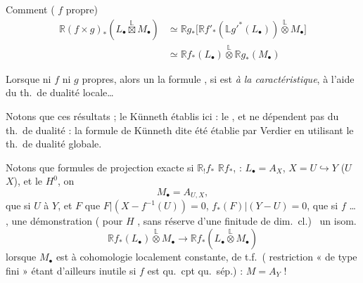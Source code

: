 \documentclass[11pt,a4paper]{article}
\begin{document}
Comment \ill{} \ill{} \ill{} (\ill{} \ill{} $f$ propre)
\begin{align*}
  \mathbb{R}(f \times g)_{*}(L_{\bullet} \overset{\mathbb{L}}{\boxtimes} M_{\bullet})
  &\simeq \mathbb{R}g_{*}\big[\mathbb{R}f'_{*}(\mathbb{L}g'^{*}(L_{\bullet})) \overset{\mathbb{L}}{\otimes} M_{\bullet}\big] \\
  &\simeq \mathbb{R}f_{*}(L_{\bullet}) \overset{\mathbb{L}}{\otimes} \mathbb{R}g_{*}(M_{\bullet})
\end{align*}

Lorsque ni $f$ ni $g$ propres, alors \struck{\ill{}} \ill{} \ill{} \ill{} un  \ill{} \ill{} \ill{} \ill{} \ill{}  la formule  \ill{}, si \ill{} est \emph{ à la caractéristique}, \ill{} \ill{} \ill{}  à l'aide du th.\ de dualité locale…

Notons que ces résultats ; le Künneth établis ici \ill{} \ill{} \ill{}  : le , et ne dépendent pas du th.\ de dualité : la formule de Künneth  dite   été établie par Verdier  en utilisant le th.\ de dualité globale.

Notons que  formules de projection  \ill{} \ill{} exacte si \ill{}  $\mathbb{R}_{!}f_{*}$ \ill{} $\mathbb{R}f_{*}$, \ill{} \ill{} \ill{} : $L_{\bullet} = A_{X}$, $X = U \hookrightarrow Y$ \ill{} \ill{} ($U$ \ill{} \ill{} $X$), et le $H^{0}$, on
\[
  M_{\bullet} = A_{U,X} ,
\]
\ill{} \ill{} \ill{} que si $U$ \ill{} \ill{} \ill{} \ill{} à $Y$, et $F$ \ill{} \ill{} que $F|(X - f^{-1}(U)) = 0$, \ill{} $f_{*}(F)|(Y - U) = 0$, \ill{} \ill{} que \ill{} \ill{} \ill{} si $f$ \ill{} \ill{}… \struck{\ill{}} , une démonstration   ( pour $H$  , sans \ill{} réserve d'une finitude de dim.\ cl.)\  \ill{} \ill{} \ill{} un isom.
\[
  \mathbb{R}f_{*}(L_{\bullet}) \overset{\mathbb{L}}{\otimes} M_{\bullet}
  \longrightarrow \mathbb{R}f_{*}(L_{\bullet} \overset{\mathbb{L}}{\otimes} M_{\bullet})
\]
lorsque $M_{\bullet}$ est à cohomologie localement constante, de t.f.\ ( restriction « de type fini » étant d'ailleurs inutile si $f$ est qu.\ cpt qu.\ sép.) : \ill{} \ill{} \ill{} \ill{} \ill{} \ill{} $M = A_{Y}$ !
\end{document}
